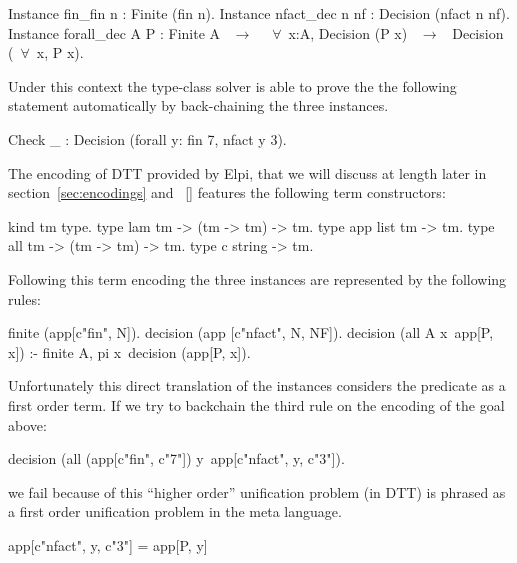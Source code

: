 \documentclass[sigconf,natbib=false]{acmart}
\begin{document}
\begin{coqcode}
Instance fin_fin n : Finite (fin n).
Instance nfact_dec n nf : Decision (nfact n nf).
Instance forall_dec A P : Finite A ~$\to$~ 
  ~$\forall$~x:A, Decision (P x) ~$\to$~ Decision (~$\forall$~x, P x).
\end{coqcode}

\noindent Under this context the type-class solver is able to prove
the the following statement automatically by back-chaining
the three instances.

\begin{coqcode}
  Check _ : Decision (forall y: fin 7, nfact y 3).
\end{coqcode}

\noindent
The encoding of DTT provided by Elpi, that we will discuss at length later in
section~\ref{sec:encodings} and ~\ref{} features the following term constructors:

\begin{elpicode}
kind tm type.
type lam tm -> (tm -> tm) -> tm. %
type app list tm -> tm.          %
type all tm -> (tm -> tm) -> tm. %
type c string -> tm.             %
\end{elpicode}

\noindent
{}
Following this term encoding the three instances are represented by the
following rules:

\begin{elpicode}
finite (app[c"fin", N]).
decision (app [c"nfact", N, NF]).
decision (all A x\ app[P, x]) :- finite A,
  pi x\ decision (app[P, x]).
\end{elpicode}

\noindent
{}
Unfortunately this direct translation of the instances considers the
predicate  as a first order term. If we try to backchain the
third rule on the encoding of the goal above:
  
\begin{elpicode}
decision (all (app[c"fin", c"7"]) y\
  app[c"nfact", y, c"3"]).
\end{elpicode}

\noindent
we fail because of this ``higher order'' unification problem (in DTT)
is phrased as a first order unification problem in the meta language.

\begin{elpicode}
app[c"nfact", y, c"3"] = app[P, y]
\end{elpicode}
\end{document}
